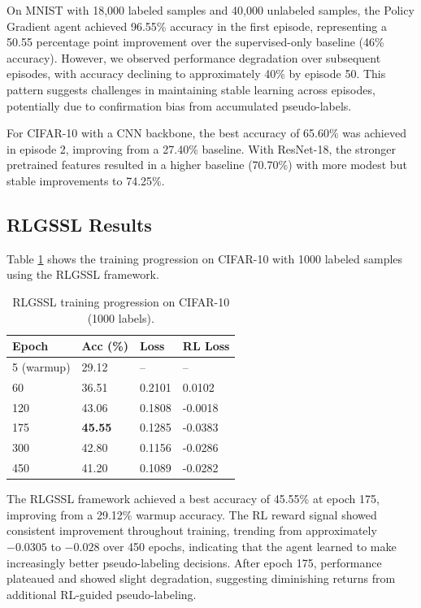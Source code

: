 \documentclass[pdflatex,sn-mathphys-num]{sn-jnl}%
\theoremstyle{thmstyleone}%
\theoremstyle{thmstyletwo}%
\theoremstyle{thmstylethree}%
\begin{document}
On MNIST with 18,000 labeled samples and 40,000 unlabeled samples, the Policy Gradient agent achieved 96.55\% accuracy in the first episode, representing a 50.55 percentage point improvement over the supervised-only baseline (46\% accuracy). However, we observed performance degradation over subsequent episodes, with accuracy declining to approximately 40\% by episode 50. This pattern suggests challenges in maintaining stable learning across episodes, potentially due to confirmation bias from accumulated pseudo-labels.

For CIFAR-10 with a CNN backbone, the best accuracy of 65.60\% was achieved in episode 2, improving from a 27.40\% baseline. With ResNet-18, the stronger pretrained features resulted in a higher baseline (70.70\%) with more modest but stable improvements to 74.25\%.

\subsection{RLGSSL Results}
Table \ref{tab:rlgssl_training} shows the training progression on CIFAR-10 with 1000 labeled samples using the RLGSSL framework.

\begin{table}[h]
\caption{RLGSSL training progression on CIFAR-10 (1000 labels).}\label{tab:rlgssl_training}
\begin{tabular}{@{}llll@{}}
\toprule
Epoch & Acc (\%) & Loss & RL Loss \\
\midrule
5 (warmup) & 29.12 & -- & -- \\
60 & 36.51 & 0.2101 & 0.0102 \\
120 & 43.06 & 0.1808 & -0.0018 \\
175 & \textbf{45.55} & 0.1285 & -0.0383 \\
300 & 42.80 & 0.1156 & -0.0286 \\
450 & 41.20 & 0.1089 & -0.0282 \\
\bottomrule
\end{tabular}
\end{table}

The RLGSSL framework achieved a best accuracy of 45.55\% at epoch 175, improving from a 29.12\% warmup accuracy. The RL reward signal showed consistent improvement throughout training, trending from approximately $-0.0305$ to $-0.028$ over 450 epochs, indicating that the agent learned to make increasingly better pseudo-labeling decisions. After epoch 175, performance plateaued and showed slight degradation, suggesting diminishing returns from additional RL-guided pseudo-labeling.
\end{document}

